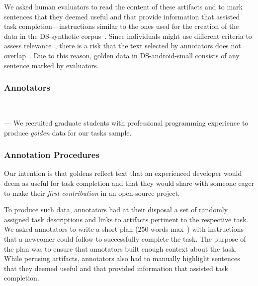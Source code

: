 We asked human evaluators to read the content of these
artifacts and 
to mark sentences that they deemed useful and that provide information that assisted task completion---instructions similar to the ones used for the creation of the 
data in the \acs{DS-synthetic} corpus~\cite{marques2020}.
Since individuals might use different criteria to
assess relevance~\cite{Barry1994, Barry1998, Freund2015},
there is a risk that
the text selected by annotators does not overlap~\cite{Freund2013, Freund2015}.
Due to this reason, golden data in \acs{DS-android-small} consists of any sentence marked by evaluators. 






\subsubsection{Annotators}
\textcolor{white}{force ident} %

--- We recruited  graduate students with professional programming experience to produce \textit{golden} data for our tasks sample. \vspace{3mm}


\subsubsection{Annotation Procedures}


Our intention is that goldens reflect text that an experienced developer would deem as useful for task completion and that they would share with someone eager to make their \textit{first contribution} in an open-source project.



To produce such data, annotators had at their disposal a set of randomly assigned task descriptions and links to artifacts pertinent to the respective task. We asked annotators to write a short plan (250 words max~\cite{Rastkar2010}) with instructions that a newcomer could follow to successfully complete the task. 
The purpose of the plan was to ensure that annotators built enough context about the task.
While perusing artifacts, annotators also had to manually highlight sentences that they deemed useful and that provided information that assisted task completion. 


